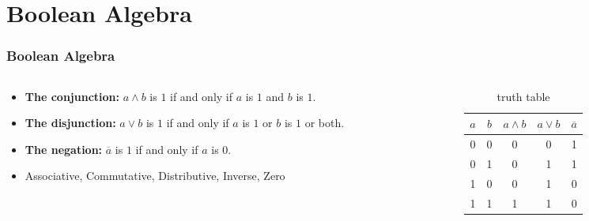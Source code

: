 \documentclass{beamer}
\begin{document}
\section{Boolean Algebra}
\begin{frame}\frametitle{Boolean Algebra}
  \begin{columns}
  \begin{column}{6cm}
  \begin{itemize}
    \item \textbf{The conjunction:} $a\land b$ is $1$ if and only if $a$ is $1$ and $b$ is $1$.\\
    \item \textbf{The disjunction:} $a\lor b$  is $1$ if and only if $a$ is $1$ or $b$ is $1$ or both.\\
    \item \textbf{The negation:}  $\overline{a}$ is $1$ if and only if $a$ is $0$.
    \item Associative, Commutative, Distributive, Inverse, Zero
  \end{itemize}
  \end{column}
  
    
  \begin{column}{6cm}
  \begin{table}[H]
  \centering
  \begin{tabular}{c|c||c|c|c}
  \textbf{$a$} & \textbf{$b$} & \textbf{$a\land b$} & \textbf{$a\lor b$} & \textbf{$\overline{a}$} \\ \hline
  0          & 0          & 0            & 0            & 1           \\
  0          & 1          & 0            & 1            & 1           \\
  1          & 0          & 0            & 1            & 0           \\
  1          & 1          & 1            & 1            & 0          
  \end{tabular}
  \caption{truth table}
  \label{tab:truth}
  \end{table}
  \end{column}
  
  \end{columns}
\end{frame}
\end{document}
